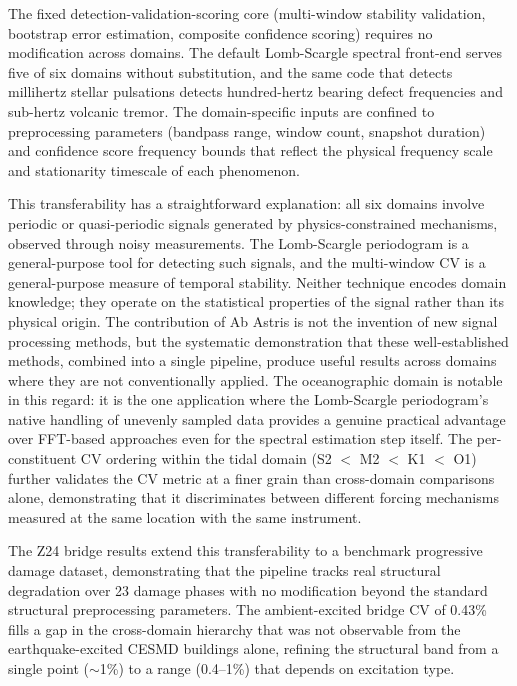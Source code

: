 \documentclass[11pt,a4paper]{article}
\begin{document}
The fixed detection-validation-scoring core (multi-window stability validation, bootstrap error estimation, composite confidence scoring) requires no modification across domains. The default Lomb-Scargle spectral front-end serves five of six domains without substitution, and the same code that detects millihertz stellar pulsations detects hundred-hertz bearing defect frequencies and sub-hertz volcanic tremor. The domain-specific inputs are confined to preprocessing parameters (bandpass range, window count, snapshot duration) and confidence score frequency bounds that reflect the physical frequency scale and stationarity timescale of each phenomenon.

This transferability has a straightforward explanation: all six domains involve periodic or quasi-periodic signals generated by physics-constrained mechanisms, observed through noisy measurements. The Lomb-Scargle periodogram is a general-purpose tool for detecting such signals, and the multi-window CV is a general-purpose measure of temporal stability. Neither technique encodes domain knowledge; they operate on the statistical properties of the signal rather than its physical origin. The contribution of Ab Astris is not the invention of new signal processing methods, but the systematic demonstration that these well-established methods, combined into a single pipeline, produce useful results across domains where they are not conventionally applied. The oceanographic domain is notable in this regard: it is the one application where the Lomb-Scargle periodogram's native handling of unevenly sampled data provides a genuine practical advantage over FFT-based approaches even for the spectral estimation step itself. The per-constituent CV ordering within the tidal domain (S2 $<$ M2 $<$ K1 $<$ O1) further validates the CV metric at a finer grain than cross-domain comparisons alone, demonstrating that it discriminates between different forcing mechanisms measured at the same location with the same instrument.

The Z24 bridge results extend this transferability to a benchmark progressive damage dataset, demonstrating that the pipeline tracks real structural degradation over 23 damage phases with no modification beyond the standard structural preprocessing parameters. The ambient-excited bridge CV of 0.43\% fills a gap in the cross-domain hierarchy that was not observable from the earthquake-excited CESMD buildings alone, refining the structural band from a single point (${\sim}$1\%) to a range (0.4--1\%) that depends on excitation type.
\end{document}

